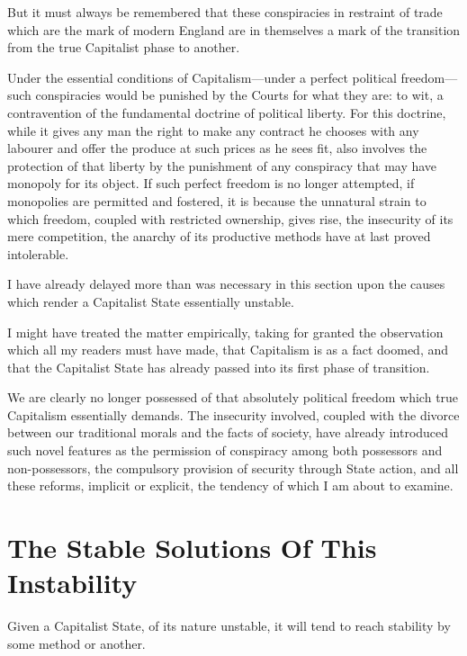 \documentclass{book}
\begin{document}
But it must always be remembered that these conspiracies in restraint of trade which are the mark of modern England are in themselves a mark of the transition from the true Capitalist phase to another.

Under the essential conditions of Capitalism—under a perfect political freedom—such conspiracies would be punished by the Courts for what they are: to wit, a contravention of the fundamental doctrine of political liberty. For this doctrine, while it gives any man the right to make any contract he chooses with any labourer and offer the produce at such prices as he sees fit, also involves the protection of that liberty by the punishment of any conspiracy that may have monopoly for its object. If such perfect freedom is no longer attempted, if monopolies are permitted and fostered, it is because the unnatural strain to which freedom, coupled with restricted ownership, gives rise, the insecurity of its mere competition, the anarchy of its productive methods have at last proved intolerable.

I have already delayed more than was necessary in this section upon the causes which render a Capitalist State essentially unstable.

I might have treated the matter empirically, taking for granted the observation which all my readers must have made, that Capitalism is as a fact doomed, and that the Capitalist State has already passed into its first phase of transition.

We are clearly no longer possessed of that absolutely political freedom which true Capitalism essentially demands. The insecurity involved, coupled with the divorce between our traditional morals and the facts of society, have already introduced such novel features as the permission of conspiracy among both possessors and non-possessors, the compulsory provision of security through State action, and all these reforms, implicit or explicit, the tendency of which I am about to examine.

\chapter{The Stable Solutions Of This Instability}
\label{chapter-6}
Given a Capitalist State, of its nature unstable, it will tend to reach stability by some method or another.
\end{document}
